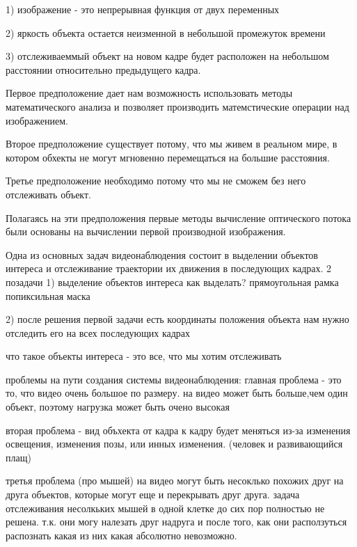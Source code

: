 \documentclass[12pt,a4paper,oneside,titlepage]{article}
\begin{document}
1) изображение - это непрерывная функция от двух переменных

2) яркость объекта остается неизменной в небольшой промежуток времени

3) отслеживаеммый объект на новом кадре будет расположен на небольшом расстоянии относительно предыдущего кадра.

Первое предположение дает нам возможность использовать методы математического анализа и позволяет производить матемстические операции над изображением.

Второе предположение существует потому, что мы живем в реальном мире, в котором  обхекты не могут мгновенно перемещаться на большие расстояния.

Третье предположение необходимо потому что мы не сможем без него отслеживать объект.





Полагаясь на эти предположения первые методы вычисление оптического потока были основаны на вычислении первой производной изображения.







Одна из основных задач видеонаблюдения состоит в выделении объектов интереса и отслеживание траектории их движения в последующих кадрах.
2 позадачи
1) выделение объектов интереса
как выделать?
прямоугольная рамка
попиксильная маска

2) после решения первой задачи есть координаты положения объекта
нам нужно отследить его на всех последующих кадрах

что такое объекты интереса - это все, что мы хотим отслеживать

проблемы на пути создания системы видеонаблюдения:
главная проблема - это то, что видео очень большое по размеру.
на видео может быть больше,чем один объект, поэтому нагрузка может быть очено высокая

вторая проблема - вид объхекта от кадра к кадру будет меняться из-за изменения освещения, изменения позы, или инных изменения. (человек и развивающийся плащ)

третья проблема (про мышей)
на видео могут быть несоклько похожих друг на друга объектов, которые могут еще и перекрывать друг друга.
задача отслеживания несолкьких мышей в одной клетке до сих пор полностью не решена.
т.к. они могу налезать друг надруга и после того, как они расползуться распознать какая из них какая абсолютно невозможно.
\end{document}
